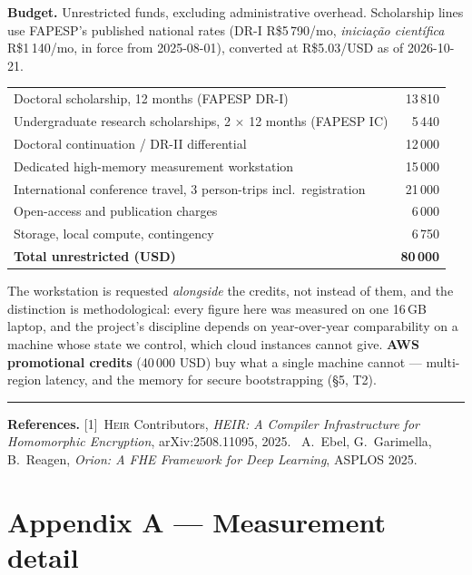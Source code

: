 \documentclass[10pt]{article}
\newcommand{\heir}{\textsc{Heir}}
\begin{document}
\medskip
\noindent\textbf{Budget.} Unrestricted funds, excluding administrative overhead.
Scholarship lines use FAPESP's published national rates (DR-I R\$5\,790/mo,
\emph{iniciação científica} R\$1\,140/mo, in force from 2025-08-01), converted at
R\$5.03/USD as of 2026-10-21.

\begin{center}\footnotesize
\begin{tabular}{@{}lr@{}}
\toprule
Doctoral scholarship, 12 months (FAPESP DR-I) & 13\,810 \\
Undergraduate research scholarships, 2 $\times$ 12 months (FAPESP IC) & 5\,440 \\
Doctoral continuation / DR-II differential & 12\,000 \\
Dedicated high-memory measurement workstation & 15\,000 \\
International conference travel, 3 person-trips incl.\ registration & 21\,000 \\
Open-access and publication charges & 6\,000 \\
Storage, local compute, contingency & 6\,750 \\
\midrule
\textbf{Total unrestricted (USD)} & \textbf{80\,000} \\
\bottomrule
\end{tabular}
\end{center}

\noindent The workstation is requested \emph{alongside} the credits, not instead
of them, and the distinction is methodological: every figure here was measured
on one 16\,GB laptop, and the project's discipline depends on year-over-year
comparability on a machine whose state we control, which cloud instances cannot
give. \textbf{AWS promotional credits} (40\,000 USD) buy what a single machine
cannot --- multi-region latency, and the memory for secure bootstrapping (§5,
T2).

\vspace{0.6ex}\hrule\vspace{0.6ex}
{\scriptsize\noindent\textbf{References.} [1]~\heir{} Contributors,
\emph{HEIR: A Compiler Infrastructure for Homomorphic Encryption},
arXiv:2508.11095, 2025. \quad [2]~A.~Ebel, G.~Garimella, B.~Reagen,
\emph{Orion: A FHE Framework for Deep Learning}, ASPLOS 2025.\par}

\clearpage
\appendix
\section*{Appendix A --- Measurement detail}
\setcounter{section}{1}
\end{document}
